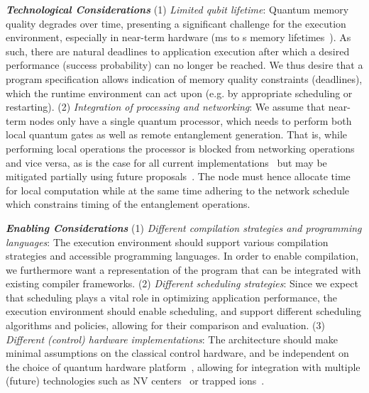 \noindent\textit{\textbf{Technological Considerations}}
(1) \textit{Limited qubit lifetime}:
Quantum memory quality degrades over time, presenting a significant challenge for the execution environment,
especially in near-term hardware (ms to s memory lifetimes~\cite{ruf2021quantum, pompili2021realization, krutyanskiy2023telecom}).
As such, there are natural deadlines to application execution after which a desired performance (success probability) can no longer be reached.
We thus desire that a program specification allows indication of memory quality constraints (deadlines), which the runtime environment can act upon (e.g. by appropriate scheduling or restarting).
(2) \textit{Integration of processing and networking}: We assume that near-term nodes only have a single quantum processor, which needs to perform both local quantum gates as well as remote entanglement generation.
That is, while performing local operations the processor is blocked from networking operations and vice versa, as is the case for all current implementations~\cite{pompili2021realization, krutyanskiy2023entanglement} but may be mitigated partially using future proposals~\cite{vardoyan2022quantum}. 
The node must hence allocate time for local computation while at the same time adhering to the network schedule which constrains timing of the entanglement operations.

\noindent\textit{\textbf{Enabling Considerations}}
(1) \textit{Different compilation strategies and programming languages}: The execution environment should support various compilation strategies and accessible programming languages. 
In order to enable compilation, we furthermore want a representation of the program that can be integrated with existing compiler frameworks.
(2) \textit{Different scheduling strategies}: Since we expect that scheduling plays a vital role in optimizing application performance, the execution environment should enable scheduling, and support different scheduling algorithms and policies, 
allowing for their comparison and evaluation.
(3) \textit{Different (control) hardware implementations}: The architecture should make minimal assumptions on the classical control hardware, and be independent on the choice of quantum hardware platform~\cite{carlothesis},
allowing for integration with multiple (future) technologies such as NV centers~\cite{pompili2022experimental} or trapped ions~\cite{drmota2023robust}.

